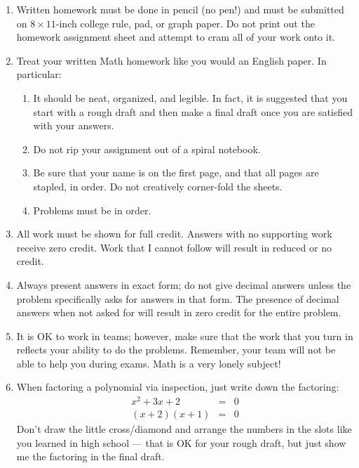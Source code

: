 \documentclass[letterpaper,12pt,fleqn]{article}
\begin{document}

\vspace{0.5in}

\begin{enumerate}
\item Written homework must be done in pencil (no pen!) and must be submitted
  on $8\times11$-inch college rule, pad, or graph paper. Do not print out the
  homework assignment sheet and attempt to cram all of your work onto it.

\item Treat your written Math homework like you would an English paper. In
  particular:
  \begin{enumerate}
  \item It should be neat, organized, and legible. In fact, it is suggested
    that you start with a rough draft and then make a final draft once you
    are satisfied with your answers.

  \item Do not rip your assignment out of a spiral notebook.
    
  \item Be sure that your name is on the first page, and that all pages are
    stapled, in order. Do not creatively corner-fold the sheets.
    
  \item Problems must be in order.
  \end{enumerate}
  
\item All work must be shown for full credit. Answers with no supporting work
  receive zero credit. Work that I cannot follow will result in reduced or no
  credit.

\item Always present answers in exact form; do not give decimal answers unless
  the problem specifically asks for answers in that form. The presence of
  decimal answers when not asked for will result in zero credit for the entire
  problem.

\item It is OK to work in teams; however, make sure that the work that you turn
  in reflects your ability to do the problems. Remember, your team will not
  be able to help you during exams. Math is a very lonely subject!

\item When factoring a polynomial via inspection, just write down the factoring:
\begin{eqnarray*}
x^2+3x+2 &=& 0 \\
(x+2)(x+1) &=& 0
\end{eqnarray*}
Don't draw the little cross/diamond and arrange the numbers in the slots like
you learned in high school --- that is OK for your rough draft, but just show me
the factoring in the final draft.


\end{enumerate}
\end{document}
